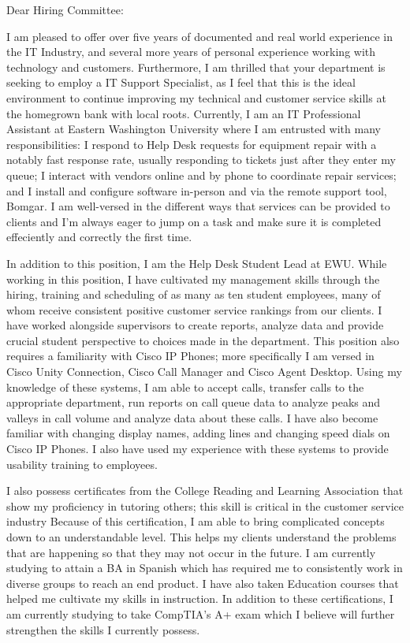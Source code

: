 \documentclass[a4paper,10pt]{article}
\begin{document}
Dear Hiring Committee:\\

\par
I am pleased to offer over five years of documented and real world experience in the IT Industry, and several more years of personal experience working with technology and customers. Furthermore, I am thrilled that your department is seeking to employ a IT Support Specialist, as I feel that this is the ideal environment to continue improving my technical and customer service skills at the homegrown bank with local roots. Currently, I am an IT Professional Assistant at Eastern Washington University where I am entrusted with many responsibilities: I respond to Help Desk requests for equipment repair with a notably fast response rate, usually responding to tickets just after they enter my queue; I interact with vendors online and by phone to coordinate repair services; and I install and configure software in-person and via the remote support tool, Bomgar. I am well-versed in the different ways that services can be provided to clients and I'm always eager to jump on a task and make sure it is completed effeciently and correctly the first time.
\par
In addition to this position, I am the Help Desk Student Lead at EWU. While working in this position, I have cultivated my management skills through the hiring, training and scheduling of as many as ten student employees, many of whom receive consistent positive customer service rankings from our clients. I have worked alongside supervisors to create reports, analyze data and provide crucial student perspective to choices made in the department. This position also requires a familiarity with Cisco IP Phones; more specifically I am versed in Cisco Unity Connection, Cisco Call Manager and Cisco Agent Desktop. Using my knowledge of these systems, I am able to accept calls, transfer calls to the appropriate department, run reports on call queue data to analyze peaks and valleys in call volume and analyze data about these calls. I have also become familiar with changing display names, adding lines and changing speed dials on Cisco IP Phones. I also have used my experience with these systems to provide usability training to employees.
\par
I also possess certificates from the College Reading and Learning Association that show my proficiency in tutoring others; this skill is critical in the customer service industry Because of this certification, I am able to bring complicated concepts down to an understandable level. This helps my clients understand the problems that are happening so that they may not occur in the future. I am currently studying to attain a BA in Spanish which has required me to consistently work in diverse groups to reach an end product. I have also taken Education courses that helped me cultivate my skills in instruction. In addition to these certifications, I am currently studying to take CompTIA's A+ exam which I believe will further strengthen the skills I currently possess.\\
\end{document}
